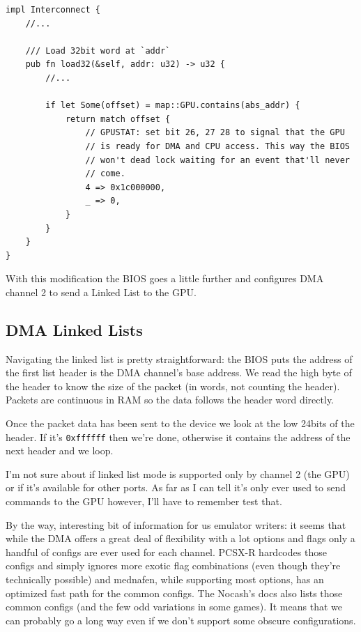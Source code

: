 \documentclass[a4paper]{article}
\newcommand{\code}[1] {\texttt{#1}}
\begin{document}
\begin{lstlisting}
impl Interconnect {
    //...

    /// Load 32bit word at `addr`
    pub fn load32(&self, addr: u32) -> u32 {
        //...

        if let Some(offset) = map::GPU.contains(abs_addr) {
            return match offset {
                // GPUSTAT: set bit 26, 27 28 to signal that the GPU
                // is ready for DMA and CPU access. This way the BIOS
                // won't dead lock waiting for an event that'll never
                // come.
                4 => 0x1c000000,
                _ => 0,
            }
        }
    }
}
\end{lstlisting}

With this modification the BIOS goes a little further and configures
DMA channel 2 to send a Linked List to the GPU.

\subsection{DMA Linked Lists}

Navigating the linked list is pretty straightforward: the BIOS puts
the address of the first list header is the DMA channel's base
address. We read the high byte of the header to know the size of the
packet (in words, not counting the header). Packets are continuous in
RAM so the data follows the header word directly.

Once the packet data has been sent to the device we look at the low
24bits of the header. If it's \code{0xffffff} then we're done,
otherwise it contains the address of the next header and we loop.

I'm not sure about if linked list mode is supported only by channel 2
(the GPU) or if it's available for other ports. As far as I can tell
it's only ever used to send commands to the GPU however, I'll have to
remember test that.

By the way, interesting bit of information for us emulator writers: it
seems that while the DMA offers a great deal of flexibility with a lot
options and flags only a handful of configs are ever used for each
channel. PCSX-R hardcodes those configs and simply ignores more exotic
flag combinations (even though they're technically possible) and
mednafen, while supporting most options, has an optimized fast path
for the common configs. The Nocash's docs also lists those common
configs (and the few odd variations in some games). It means that we
can probably go a long way even if we don't support some obscure
configurations.
\end{document}
